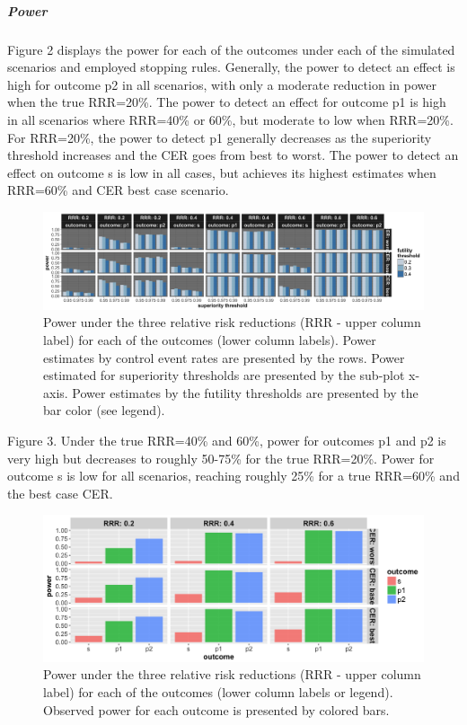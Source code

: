 \documentclass[]{article}
\let\oldsubparagraph\subparagraph
\renewcommand{\subparagraph}[1]{\oldsubparagraph{#1}\mbox{}}
\begin{document}
\hypertarget{power}{%
\subparagraph{Power}\label{power}}

Figure 2 displays the power for each of the outcomes under each of the
simulated scenarios and employed stopping rules. Generally, the power to
detect an effect is high for outcome p2 in all scenarios, with only a
moderate reduction in power when the true RRR=20\%. The power to detect
an effect for outcome p1 is high in all scenarios where RRR=40\% or
60\%, but moderate to low when RRR=20\%. For RRR=20\%, the power to
detect p1 generally decreases as the superiority threshold increases and
the CER goes from best to worst. The power to detect an effect on
outcome s is low in all cases, but achieves its highest estimates when
RRR=60\% and CER best case scenario.

\begin{figure}
  \caption{Power under the three relative risk reductions (RRR - upper column label) for each of the outcomes (lower
  column labels). Power estimates by control event rates are presented by the rows. Power estimated for superiority
  thresholds are presented by the sub-plot x-axis. Power estimates by the futility thresholds are presented by the bar
  color (see legend).}
  \includegraphics{../plots/stop_p1_new/power_all_sim_05_stopp1_new.png}
\end{figure}

Figure 3. Under the true RRR=40\% and 60\%, power for outcomes p1 and p2
is very high but decreases to roughly 50-75\% for the true RRR=20\%.
Power for outcome s is low for all scenarios, reaching roughly 25\% for
a true RRR=60\% and the best case CER.

\begin{figure}
  \caption{Power under the three relative risk reductions (RRR - upper column label) for each of the outcomes (lower
  column labels or legend). Observed power for each outcome is presented by colored bars.}
  \includegraphics{../plots/stop_p1_new/power_sim_05_stopp1_new.png}
\end{figure}
\end{document}
